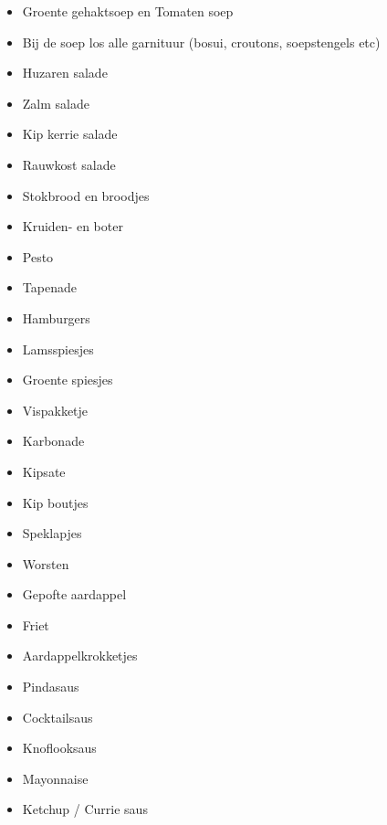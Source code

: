 \begin{itemize}
	\item	Groente gehaktsoep en Tomaten soep  
	\item	Bij de soep los alle garnituur (bosui, croutons, soepstengels etc)
	\item	Huzaren salade
	\item	Zalm salade
	\item	Kip kerrie salade
	\item	Rauwkost salade
	\item	Stokbrood en broodjes
	\item	Kruiden- en boter
	\item	Pesto
	\item	Tapenade
	\item	Hamburgers
	\item	Lamsspiesjes
	\item	Groente spiesjes
	\item	Vispakketje
	\item	Karbonade
	\item	Kipsate
	\item	Kip boutjes
	\item	Speklapjes
	\item	Worsten
	\item	Gepofte aardappel
	\item	Friet
	\item	Aardappelkrokketjes
	\item	Pindasaus
	\item	Cocktailsaus
	\item	Knoflooksaus
	\item	Mayonnaise
	\item	Ketchup / Currie saus
\end{itemize}
